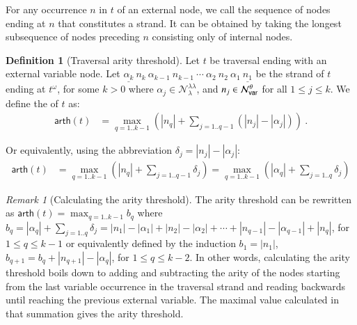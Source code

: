 \documentclass{elsarticle}
\theoremstyle{plain}
\theoremstyle{definition}
\newtheorem{definition}{Definition}[section]
\theoremstyle{remark}
\newtheorem{remark}{Remark}[section]
\newcommand\Nodes{\mathcal{N}}%
\newcommand\NodesVar{\Nodes_{\sf var}}%
\newcommand\NodesLmd{\Nodes_\lambda}%
\newcommand{\ghostlmd}{{\lambda\!\!\lambda}}
\newcommand{\ghostvar}{\theta}
\newcommand\ImNodesVar{\NodesVar^\ghostvar}
\newcommand\ImNodesLmd{\NodesLmd^\ghostlmd}
\newcommand\arth{\textsf{arth}} %
\begin{document}
For any occurrence $n$ in $t$ of an external node, we call  the sequence of nodes ending at $n$ that constitutes a strand. It can be obtained by taking the longest subsequence of nodes preceding $n$ consisting only of internal nodes.

\begin{definition}[Traversal arity threshold]
\label{dfn:arity-threshold}
Let $t$ be traversal ending with an external variable node.
Let $\underline{\alpha_k}\ n_k\ \alpha_{k-1}\ n_{k-1}\ \cdots\ \alpha_2\ n_2\ \alpha_1\ \underline{n_1}$ be the strand of $t$ ending at $t^\omega$, for some $k>0$  where $\alpha_j \in \ImNodesLmd$, and $n_j \in \ImNodesVar$ for all $1\leq j\leq k$.
We define the  of $t$ as:
\begin{align*}
\arth(t) &= \max_{q=1..k-1} \left( |n_q| + \sum_{j=1..q-1} (|n_j| - |\alpha_j|) \right)\ .
\end{align*}
\end{definition}

Or equivalently, using the abbreviation $ \delta_j = |n_j| - |\alpha_j|$:
\begin{align*}
    \arth(t) &= \max_{q=1..k-1} \left( |n_q| + \sum_{j=1..q-1} \delta_j \right)     = \max_{q=1..k-1} \left( |\alpha_q| + \sum_{j=1..q} \delta_j\right)
\end{align*}


\begin{remark}[Calculating the arity threshold]
The arity threshold can be rewritten as
$\arth(t) = \max_{q=1..k-1} b_q$
where $b_q = |\alpha_q| + \sum_{j=1..q} \delta_j = |n_1| - |\alpha_1| + |n_2| - |\alpha_2| + \cdots + |n_{q-1}| - |\alpha_{q-1}| + |n_q|$, for $1\leq q\leq k-1$ or equivalently defined by the induction
 $b_1 = |n_1|$, $b_{q+1} = b_q + |n_{q+1}| - |\alpha_q|$, for $1 \leq q \leq k-2$.
In other words, calculating the arity threshold boils down to  adding and subtracting the arity of the nodes starting from the last variable occurrence in the traversal strand and reading backwards until reaching the previous external variable. The maximal value calculated in that summation gives the arity threshold.
\end{remark}
\end{document}
